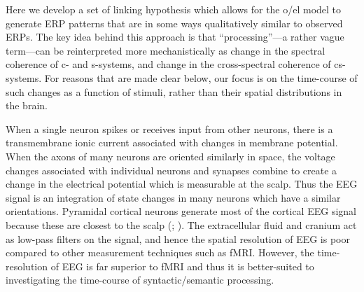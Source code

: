 Here we develop a set of linking hypothesis which allows for the o/el model to generate ERP patterns that are in some ways qualitatively similar to observed ERPs. The key idea behind this approach is that “processing”—a rather vague term—can be reinterpreted more mechanistically as change in the spectral coherence of c- and s-systems, and change in the cross-spectral coherence of cs-systems. For reasons that are made clear below, our focus is on the time-course of such changes as a function of stimuli, rather than their spatial distributions in the brain.

When a single neuron spikes or receives input from other neurons, there is a transmembrane ionic current associated with changes in membrane potential. When the axons of many neurons are oriented similarly in space, the voltage changes associated with individual neurons and synapses combine to create a change in the electrical potential which is measurable at the scalp. Thus the EEG signal is an integration of state changes in many neurons which have a similar orientations. Pyramidal cortical neurons generate most of the cortical EEG signal because these are closest to the scalp (\citealt{FedermeierLaszlo2009}; \citealt{KutasDale1997}). The extracellular fluid and cranium act as low-pass filters on the signal, and hence the spatial resolution of EEG is poor compared to other measurement techniques such as fMRI. However, the time-resolution of EEG is far superior to fMRI and thus it is better-suited to investigating the time-course of syntactic/semantic processing. 

